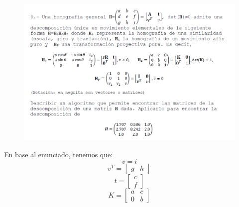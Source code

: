 \documentclass[11pt]{scrartcl} %
\begin{document}

\newpage

\subsection{ }
\begin{figure}[h]
	\centering
	\includegraphics[width=1.0\columnwidth]{p8.png}
\end{figure}


En base al enunciado, tenemos que:
\begin{equation}
	v = i
\end{equation}
\begin{equation}
	v^{T} = \begin{bmatrix}g & h\end{bmatrix}	
\end{equation}
\begin{equation}
	t = \begin{bmatrix}c \\ f\end{bmatrix}
\end{equation}
\begin{equation}
	K = \begin{bmatrix}a & c \\ 0 & b\end{bmatrix}
\end{equation}
\end{document}
